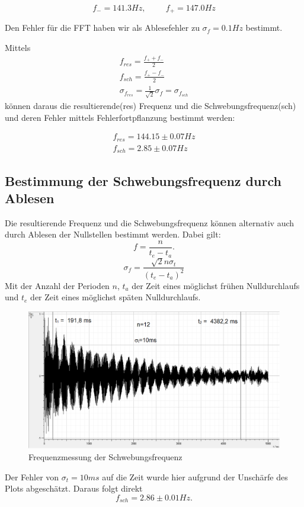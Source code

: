 \documentclass[12pt,a4paper]{article}
\begin{document}
\begin{equation}
f_-=141.3 Hz, \hspace{1cm} f_+=147.0 Hz
\end{equation}

Den Fehler für die FFT haben wir als Ablesefehler zu $ \sigma_f=0.1Hz$ bestimmt.

Mittels
\begin{align}
f_{res}=\frac{f_+ + f_-}{2} \\
f_{sch}=\frac{f_+ - f_-}{2} \\
\sigma_{f_{res}}=\frac{1}{\sqrt{2}}\sigma_f=\sigma_{f_{sch}}
\end{align}
können daraus die resultierende(res) Frequenz und die  Schwebungsfrequenz(sch) und deren Fehler mittels Fehlerfortpflanzung bestimmt werden:

\begin{align}
f_{res}=144.15 \pm 0.07 Hz\\
f_{sch}=2.85 \pm 0.07 Hz
\end{align}

\subsection{Bestimmung der Schwebungsfrequenz durch Ablesen}

Die resultierende Frequenz und die Schwebungsfrequenz können alternativ auch durch Ablesen der Nullstellen bestimmt werden. Dabei gilt:
\begin{equation}
f=\frac{n}{t_e-t_a}.
\end{equation}
\begin{equation}
\sigma_f=\frac{\sqrt{2}n\sigma_t}{(t_e-t_a)^2}
\end{equation}
Mit der Anzahl der Perioden $n$, $t_a$ der Zeit eines möglichst frühen Nulldurchlaufs und $t_e$ der Zeit eines möglichst späten Nulldurchlaufs. 
\begin{figure}[H]
\centering
\includegraphics[scale=0.5]{schwebung/Schwebung_ganz_bearb.png}
\caption{Frequenzmessung der Schwebungsfrequenz}
\end{figure}
Der Fehler von $\sigma_t=10ms$ auf die Zeit wurde hier aufgrund der Unschärfe des Plots abgeschätzt. Daraus folgt direkt
\begin{equation}
f_{sch}=2.86 \pm 0.01 Hz.
\end{equation}
\end{document}
